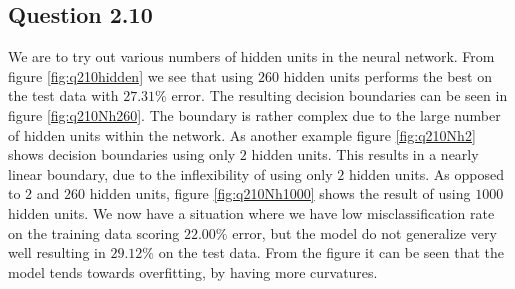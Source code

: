 \subsection*{Question 2.10}

We are to try out various numbers of hidden units in the neural
network. From figure \ref{fig:q210hidden} we see that using $260$
hidden units performs the best on the test data with $27.31\%$
error. The resulting decision boundaries can be seen in figure
\ref{fig:q210Nh260}. The boundary is rather complex due to the large
number of hidden units within the network. As another example figure
\ref{fig:q210Nh2} shows decision boundaries using only $2$ hidden
units. This results in a nearly linear boundary, due to the
inflexibility of using only $2$ hidden units. As opposed to $2$ and
$260$ hidden units, figure \ref{fig:q210Nh1000} shows the result of
using $1000$ hidden units. We now have a situation where we have low
misclassification rate on the training data scoring $22.00\%$ error,
but the model do not generalize very well resulting in $29.12\%$ on
the test data. From the figure it can be seen that the model tends
towards overfitting, by having more curvatures.

